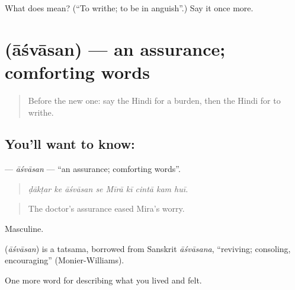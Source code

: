 \begin{tcolorbox}[breakable,colback=teal!4,colframe=teal!35!black,title={Before you move on}]
What does  mean? (\textquotedblleft{}To writhe; to be in anguish\textquotedblright{}.) Say it once more.
\end{tcolorbox}
\section[\texorpdfstring{\hi{आश्वासन} (āśvāsan)}{आश्वासन (āśvāsan)}]{ (āśvāsan) — an assurance; comforting words}

\label{lesson:HI-C458-asvasan}



\begin{quote}
Before the new one: say the Hindi for a burden, then the Hindi for to writhe.
\end{quote}

\subsection*{You'll want to know: }
\textbf{} — \emph{āśvāsan} — \textquotedblleft{}an assurance; comforting words\textquotedblright{}.

\begin{quote}
        
\end{quote}

\begin{quote}
\emph{ḍākṭar ke āśvāsan se Mīrā kī cintā kam huī.}
\end{quote}

\begin{quote}
The doctor's assurance eased Mira's worry.
\end{quote}

Masculine.

\begin{cousinweb}
\textbf{} (\emph{āśvāsan}) is a tatsama, borrowed from Sanskrit \emph{āśvāsana}, \textquotedblleft{}reviving; consoling, encouraging\textquotedblright{} (Monier-Williams).
\end{cousinweb}

\begin{grammarlens}[title={What you've built}]
One more word for describing what you lived and felt.
\end{grammarlens}

